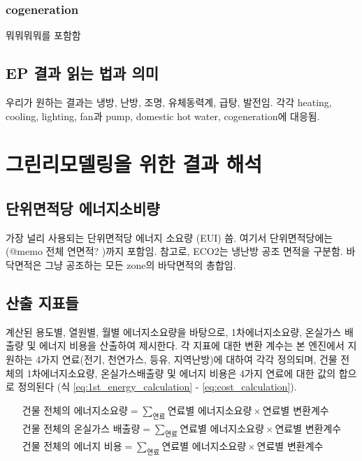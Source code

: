 \subsubsection{cogeneration}
뭐뭐뭐뭐를 포함함

\subsection{EP 결과 읽는 법과 의미}
우리가 원하는 결과는 냉방, 난방, 조명, 유체동력계, 급탕, 발전임.
각각 heating, cooling, lighting, fan과 pump, domestic hot water, cogeneration에 대응됨.


\section{그린리모델링을 위한 결과 해석}

\subsection{단위면적당 에너지소비량} \label{subsec:floorarea_definition_for_EUI}
가장 널리 사용되는 단위면적당 에너지 소요량 (EUI) 씀. 여기서 단위면적당에는 (@memo 전체 연면적? )까지 포함임. 참고로, ECO2는 냉난방 공조 면적을 구분함. 바닥면적은 그냥 공조하는 모든 zone의 바닥면적의 총합임.

\subsection{산출 지표들} \label{subsec:result_converting_coeff_definition}
\simulator\은 계산된 용도별, 열원별, 월별 에너지소요량을 바탕으로, 1차에너지소요량, 온실가스 배출량 및 에너지 비용을 산출하여 제시한다. 각 지표에 대한 변환 계수는 본 엔진에서 지원하는 4가지 연료(전기, 천연가스, 등유, 지역난방)에 대하여 각각 정의되며, 건물 전체의 1차에너지소요량, 온실가스배출량 및 에너지 비용은 4가지 연료에 대한 값의 합으로 정의된다 (식 \ref{eq:1st_energy_calculation} - \ref{eq:cost_calculation}).

\begin{align}
  \text{건물 전체의 에너지소요량} = \sum_{\text{연료}} \text{연료별 에너지소요량} \times \text{연료별 변환계수} \label{eq:1st_energy_calculation}\\
  \text{건물 전체의 온실가스 배출량} = \sum_{\text{연료}} \text{연료별 에너지소요량} \times \text{연료별 변환계수} \label{eq:co2_calculation}\\ 
  \text{건물 전체의 에너지 비용} = \sum_{\text{연료}} \text{연료별 에너지소요량} \times \text{연료별 변환계수} \label{eq:cost_calculation}
\end{align}

